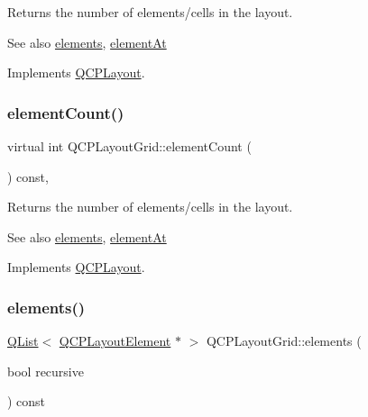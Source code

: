 Returns the number of elements/cells in the layout.

\begin{DoxySeeAlso}{See also}
\hyperlink{class_q_c_p_layout_grid_a7d5b968b4cf57393e9e387976d91f8f7}{elements}, \hyperlink{class_q_c_p_layout_grid_a4288f174082555f6bd92021bdedb75dc}{element\+At} 
\end{DoxySeeAlso}


Implements \hyperlink{class_q_c_p_layout_a39d3e9ef5d9b82ab1885ba1cb9597e56}{Q\+C\+P\+Layout}.

\mbox{\label{class_q_c_p_layout_grid_a9a8942aface780a02445ebcf14c48513}} 
\subsubsection{\texorpdfstring{element\+Count()}{elementCount()}\hspace{0.1cm}{\footnotesize\ttfamily [2/2]}}
{\footnotesize\ttfamily virtual int Q\+C\+P\+Layout\+Grid\+::element\+Count (\begin{DoxyParamCaption}{ }\end{DoxyParamCaption}) const\hspace{0.3cm}{\ttfamily [inline]}, {\ttfamily [virtual]}}

Returns the number of elements/cells in the layout.

\begin{DoxySeeAlso}{See also}
\hyperlink{class_q_c_p_layout_grid_a7d5b968b4cf57393e9e387976d91f8f7}{elements}, \hyperlink{class_q_c_p_layout_grid_a4288f174082555f6bd92021bdedb75dc}{element\+At} 
\end{DoxySeeAlso}


Implements \hyperlink{class_q_c_p_layout_a39d3e9ef5d9b82ab1885ba1cb9597e56}{Q\+C\+P\+Layout}.

\mbox{\label{class_q_c_p_layout_grid_a7d5b968b4cf57393e9e387976d91f8f7}} 
\subsubsection{\texorpdfstring{elements()}{elements()}\hspace{0.1cm}{\footnotesize\ttfamily [1/2]}}
{\footnotesize\ttfamily \hyperlink{class_q_list}{Q\+List}$<$ \hyperlink{class_q_c_p_layout_element}{Q\+C\+P\+Layout\+Element} $\ast$ $>$ Q\+C\+P\+Layout\+Grid\+::elements (\begin{DoxyParamCaption}\item[{bool}]{recursive }\end{DoxyParamCaption}) const\hspace{0.3cm}{\ttfamily [virtual]}}

